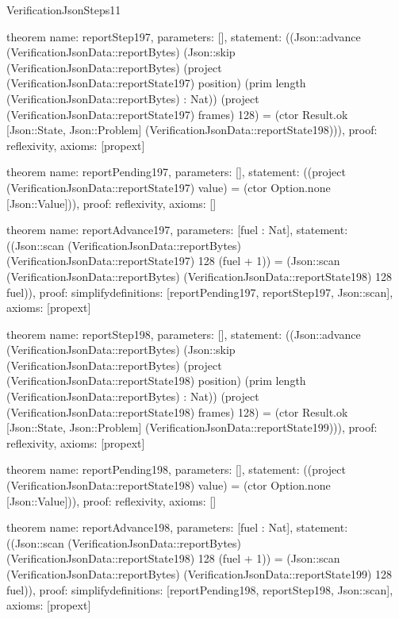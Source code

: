 \begin{lexlean}{VerificationJsonSteps11}
\begin{semanticmodule}
theorem{
  name: reportStep197,
  parameters: [],
  statement: ((Json::advance (VerificationJsonData::reportBytes) (Json::skip (VerificationJsonData::reportBytes) (project (VerificationJsonData::reportState197) position) (prim length (VerificationJsonData::reportBytes) : Nat)) (project (VerificationJsonData::reportState197) frames) 128) = (ctor Result.ok [Json::State, Json::Problem] (VerificationJsonData::reportState198))),
  proof: reflexivity{},
  axioms: [propext]
}

theorem{
  name: reportPending197,
  parameters: [],
  statement: ((project (VerificationJsonData::reportState197) value) = (ctor Option.none [Json::Value])),
  proof: reflexivity{},
  axioms: []
}

theorem{
  name: reportAdvance197,
  parameters: [fuel : Nat],
  statement: ((Json::scan (VerificationJsonData::reportBytes) (VerificationJsonData::reportState197) 128 (fuel + 1)) = (Json::scan (VerificationJsonData::reportBytes) (VerificationJsonData::reportState198) 128 fuel)),
  proof: simplify{definitions: [reportPending197, reportStep197, Json::scan]},
  axioms: [propext]
}

theorem{
  name: reportStep198,
  parameters: [],
  statement: ((Json::advance (VerificationJsonData::reportBytes) (Json::skip (VerificationJsonData::reportBytes) (project (VerificationJsonData::reportState198) position) (prim length (VerificationJsonData::reportBytes) : Nat)) (project (VerificationJsonData::reportState198) frames) 128) = (ctor Result.ok [Json::State, Json::Problem] (VerificationJsonData::reportState199))),
  proof: reflexivity{},
  axioms: [propext]
}

theorem{
  name: reportPending198,
  parameters: [],
  statement: ((project (VerificationJsonData::reportState198) value) = (ctor Option.none [Json::Value])),
  proof: reflexivity{},
  axioms: []
}

theorem{
  name: reportAdvance198,
  parameters: [fuel : Nat],
  statement: ((Json::scan (VerificationJsonData::reportBytes) (VerificationJsonData::reportState198) 128 (fuel + 1)) = (Json::scan (VerificationJsonData::reportBytes) (VerificationJsonData::reportState199) 128 fuel)),
  proof: simplify{definitions: [reportPending198, reportStep198, Json::scan]},
  axioms: [propext]
}

\end{semanticmodule}
\end{lexlean}
